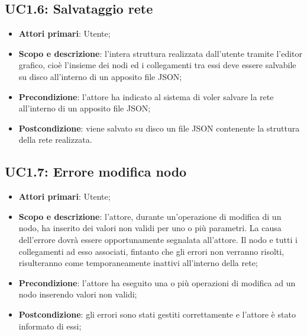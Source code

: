 \subsection{UC1.6: Salvataggio rete} 
\hypertarget{UC1.6}{} 
\begin{itemize} 
	\item{\textbf{Attori primari}: Utente;} 
	\item{\textbf{Scopo e descrizione}: l'intera struttura realizzata dall'utente tramite l'editor grafico, cioè l'insieme dei nodi ed i collegamenti tra essi deve essere salvabile su disco all'interno di un apposito file JSON;} 
	\item{ \textbf{Precondizione}: l'attore ha indicato al sistema di voler salvare la rete all'interno di un apposito file JSON;} 
	\item{\textbf{Postcondizione}: viene salvato su disco un file JSON contenente la struttura della rete realizzata.} 
\end{itemize} 
\subsection{UC1.7: Errore modifica nodo}
\begin{itemize} 
	\item{\textbf{Attori primari}: Utente;} 
	\item{\textbf{Scopo e descrizione}: l'attore, durante un'operazione di modifica di un nodo, ha inserito dei valori non validi per uno o più parametri. La causa dell'errore dovrà essere opportunamente segnalata all'attore. Il nodo e tutti i collegamenti ad esso associati, fintanto che gli errori non verranno risolti, risulteranno come temporaneamente inattivi all'interno della rete;} 
	\item{\textbf{Precondizione}: l'attore ha eseguito una o più operazioni di modifica ad un nodo inserendo valori non validi;} 
	\item{\textbf{Postcondizione}: gli errori sono stati gestiti correttamente e l'attore è stato informato di essi;} 
\end{itemize}   
